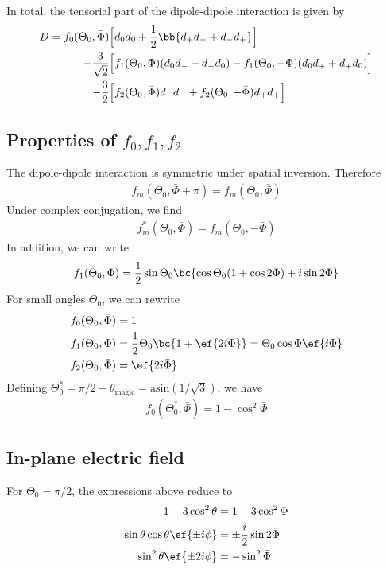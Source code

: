 In total, the tensorial part of the dipole-dipole interaction is given by
\begin{align}
    D = f_0(\Theta_0, \bar \Phi) &\Big[d_0 d_0 + \frac{1}{2}\bb{d_+ d_- + d_- d_+} \Big] \\
      \qquad-\frac{3}{\sqrt{2}} &\Big[ f_1(\Theta_0, \bar \Phi)  (d_0 d_- + d_- d_0) - f_1(\Theta_0, -\bar \Phi) (d_0 d_+ + d_+ d_0) \Big]\nonumber\\
      \qquad-\frac{3}{2} &\Big[ f_2(\Theta_0, \bar \Phi) d_- d_- + f_2(\Theta_0, -\bar \Phi) d_+ d_+\Big]\nonumber
\end{align}

\subsection{Properties of $f_0, f_1, f_2$}
The dipole-dipole interaction is symmetric under spatial inversion. Therefore
\begin{align}
    f_m(\Theta_0, \bar \Phi + \pi) = f_m(\Theta_0, \bar \Phi)
\end{align}
Under complex conjugation, we find
\begin{align}
    f_m^*(\Theta_0, \bar \Phi) = f_m(\Theta_0, -\bar \Phi)
\end{align}
In addition, we can write
\begin{align}
    f_1(\Theta_0, \bar \Phi) = \frac{1}{2} \sin \Theta_0 \bc{\cos \Theta_0 (1+\cos 2\bar \Phi) + i \sin 2 \bar \Phi}
\end{align}
For small angles $\Theta_0$, we can rewrite
\begin{align}
    f_0(\Theta_0, \bar \Phi) &= 1 \\
    f_1(\Theta_0, \bar \Phi) &= \frac{1}{2} \Theta_0 \bc{1+\ef{2 i \bar \Phi}}=\Theta_0 \cos \bar \Phi \ef{i \bar \Phi}\\
    f_2(\Theta_0, \bar \Phi) &= \ef{2 i \bar \Phi}
\end{align}
Defining $\Theta_0^* = \pi/2 - \theta_\text{magic}=\text{asin}(1/\sqrt{3})$, we have
\begin{align}
    f_0(\Theta_0^*, \bar \Phi) = 1-\cos^2\bar \Phi
\end{align}

\subsection{In-plane electric field}
For $\Theta_0=\pi/2$, the expressions above reduce to
\begin{align}
    1-3\cos^2\theta &= 1-3\cos^2\bar\Phi \\
    \sin\theta\cos\theta \ef{\pm i\phi} &= \pm \frac{i}{2} \sin 2\bar\Phi \\
    \sin^2\theta \ef{\pm 2i\phi} &= - \sin^2 \bar\Phi
\end{align}

